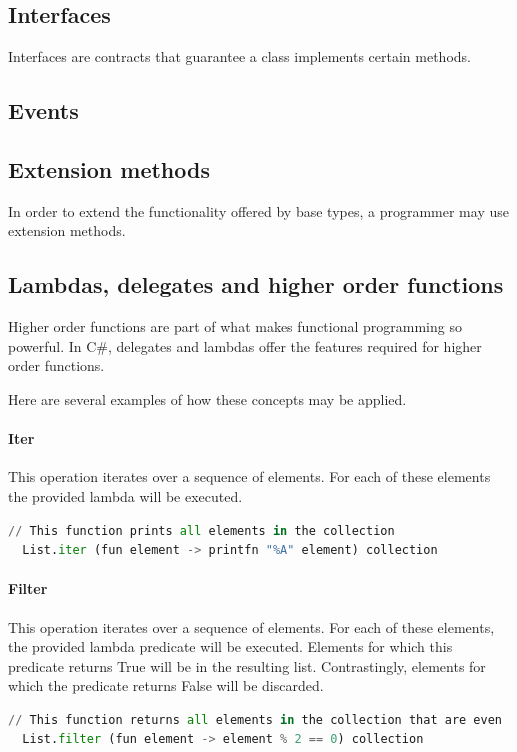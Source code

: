 \documentclass{article}
\begin{document}
\subsection{Interfaces}
Interfaces are contracts that guarantee a class implements certain methods.

\subsection{Events}


\subsection{Extension methods}
In order to extend the functionality offered by base types, a programmer may use extension methods.

\subsection{Lambdas, delegates and higher order functions}
Higher order functions are part of what makes functional programming so powerful.
In C\#, delegates and lambdas offer the features required for higher order functions.

Here are several examples of how these concepts may be applied.

\paragraph{Iter}
This operation iterates over a sequence of elements. For each of these elements the provided lambda will be executed.

\begin{lstlisting}[language=Python]
  // This function prints all elements in the collection
  List.iter (fun element -> printfn "%A" element) collection
\end{lstlisting}

\paragraph{Filter}
This operation iterates over a sequence of elements. For each of these elements, the provided lambda predicate will be executed.
Elements for which this predicate returns True will be in the resulting list. Contrastingly, elements for which the predicate returns False will be discarded.

\begin{lstlisting}[language=Python]
  // This function returns all elements in the collection that are even
  List.filter (fun element -> element % 2 == 0) collection
\end{lstlisting}
\end{document}
